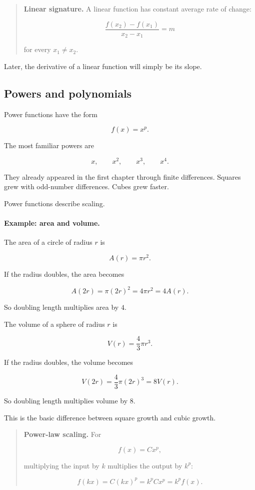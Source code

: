\begin{quote}
\textbf{Linear signature.}
A linear function has constant average rate of change:

\[
\frac{f(x_2)-f(x_1)}{x_2-x_1}=m
\]

for every \(x_1\neq x_2\).
\end{quote}

Later, the derivative of a linear function will simply be its slope.

\subsection{Powers and polynomials}
\label{subsec:powers-polynomials}

Power functions have the form

\[
f(x)=x^p.
\]

The most familiar powers are

\[
x,\qquad x^2,\qquad x^3,\qquad x^4.
\]

They already appeared in the first chapter through finite differences. Squares grew with odd-number differences. Cubes grew faster.

Power functions describe scaling.

\paragraph{Example: area and volume.}
The area of a circle of radius \(r\) is

\[
A(r)=\pi r^2.
\]

If the radius doubles, the area becomes

\[
A(2r)=\pi(2r)^2=4\pi r^2=4A(r).
\]

So doubling length multiplies area by \(4\).

The volume of a sphere of radius \(r\) is

\[
V(r)=\frac43\pi r^3.
\]

If the radius doubles, the volume becomes

\[
V(2r)=\frac43\pi(2r)^3=8V(r).
\]

So doubling length multiplies volume by \(8\).

This is the basic difference between square growth and cubic growth.

\begin{quote}
\textbf{Power-law scaling.}
For

\[
f(x)=Cx^p,
\]

multiplying the input by \(k\) multiplies the output by \(k^p\):

\[
f(kx)=C(kx)^p=k^pCx^p=k^p f(x).
\]
\end{quote}


